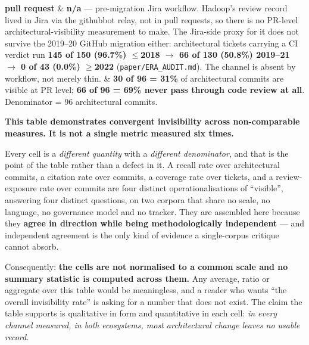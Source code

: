 \documentclass[conference]{IEEEtran}
\begin{document}
\begin{table}[htbp]
\begin{tabular}
\textbf{pull request} & \textbf{n/a} --- pre-\allowbreak{}migration Jira workflow. Hadoop's review record lived in Jira via the githubbot relay, not in pull requests, so there is no PR-level architectural-\allowbreak{}visibility measurement to make. The Jira-side proxy for it does not survive the 2019--20 GitHub migration either: architectural tickets carrying a CI verdict run \textbf{145 of 150 (96.7\%) $\leq$2018 $\rightarrow$ 66 of 130 (50.8\%) 2019--21 $\rightarrow$ 0 of 43 (0.0\%) $\geq$2022} (\texttt{paper/\allowbreak{}ERA\_\allowbreak{}AUDIT.\allowbreak{}md}). The channel is absent by workflow, not merely thin. & \textbf{30 of 96 = 31\%} of architectural commits are visible at PR level; \textbf{66 of 96 = 69\% never pass through code review at all}. Denominator = 96 architectural commits. \\

\bottomrule

\end{tabular}

\endgroup

\end{table}

\textbf{This table demonstrates convergent invisibility across non-comparable measures. It is not a single metric measured six times.}



Every cell is a \emph{different quantity} with a \emph{different denominator}, and that is the point of the table rather than a defect in it. A recall rate over architectural commits, a citation rate over commits, a coverage rate over tickets, and a review-exposure rate over commits are four distinct operationalisations of ``visible'', answering four distinct questions, on two corpora that share no scale, no language, no governance model and no tracker. They are assembled here because they \textbf{agree in direction while being methodologically independent} --- and independent agreement is the only kind of evidence a single-corpus critique cannot absorb.



Consequently: \textbf{the cells are not normalised to a common scale and no summary statistic is computed across them.} Any average, ratio or aggregate over this table would be meaningless, and a reader who wants ``the overall invisibility rate'' is asking for a number that does not exist. The claim the table supports is qualitative in form and quantitative in each cell: \emph{in every channel measured, in both ecosystems, most architectural change leaves no usable record.}
\end{document}
